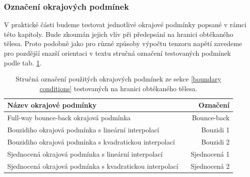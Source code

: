 \subsubsection{\fontsize{12}{15}\selectfont Označení okrajových podmínek}
V praktické části budeme testovat jednotlivé okrajové podmínky popsané v rámci této kapitoly. Bude zkoumán jejich vliv při předepsání na hranici obtékaného tělesa. Proto podobně jako pro různé způsoby výpočtu tenzoru napětí zavedeme pro pozdější snazší orientaci v textu stručná označení testovaných podmínek podle tab. \ref{tab:names of bc}.
\begin{table}[H]
	\vspace{2mm}
	\centering
	\def\arraystretch{1.65}%
	\begin{tabularx}{0.75\textwidth}{l r}
		\hline
		Název okrajové podmínky & Označení \\
		\hline
		Full-way bounce-back okrajová podmínka 			\		& Bounce-back \\
		Bouzidiho okrajová podmínka s lineární interpolací 	\	& Bouzidi 1 \\
		Bouzidiho okrajová podmínka s kvadratickou interpolací \ & Bouzidi 2	 \\
		Sjednocená okrajová podmínka s lineární interpolací \	& Sjednocená 1 \\
		Sjednocená okrajová podmínka s kvadratickou interpolací \ & Sjednocená 2 \\
		\hline
	\end{tabularx}
	\vspace{1mm}
	\caption{Stručná označení použitých okrajových podmínek ze sekce \ref{boundary conditions} testovaných na hranici obtékaného tělesa.}
	\label{tab:names of bc}
\end{table}

\vspace{-2mm}

